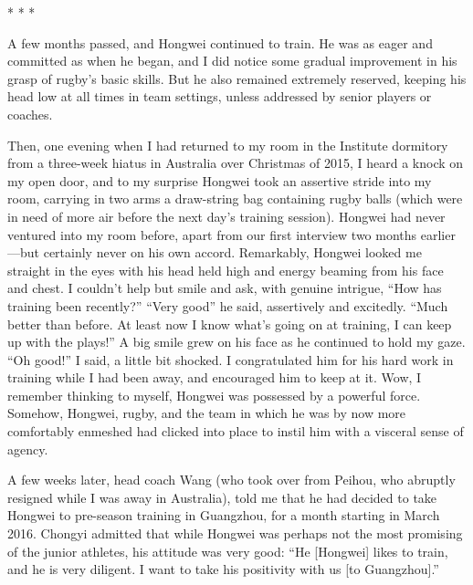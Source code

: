 \begin{CJK}{UTF8}{gbsn}
                            \begin{center}
                              * * *
                            \end{center}

A few months passed, and Hongwei continued to train.  He was as eager and committed as when he began, and I did notice some gradual improvement in his grasp of rugby's basic skills.  But he also remained extremely reserved, keeping his head low at all times in team settings, unless addressed by senior players or coaches.

Then, one evening when I had returned to my room in the Institute dormitory from a three-week hiatus in Australia over Christmas of 2015, I heard a knock on my open door, and to my surprise Hongwei took an assertive stride into my room, carrying in two arms a draw-string bag containing rugby balls (which were in need of more air before the next day's training session).  Hongwei had never ventured into my room before, apart from our first interview two months earlier---but certainly never on his own accord.  Remarkably, Hongwei looked me straight in the eyes with his head held high and energy beaming from his face and chest.  I couldn't help but smile and ask, with genuine intrigue, ``How has training been recently?''
``Very good'' he said, assertively and excitedly.  ``Much better than before.  At least now I know what’s going on at training, I can keep up with the plays!''  A big smile grew on his face as he continued to hold my gaze.  ``Oh good!'' I said, a little bit shocked.  I congratulated him for his hard work in training while I had been away, and encouraged him to keep at it.  Wow, I remember thinking to myself, Hongwei was possessed by a powerful force.  Somehow, Hongwei, rugby, and the team in which he was by now more comfortably enmeshed had clicked into place to instil him with a visceral sense of agency.

A few weeks later, head coach Wang (who took over from Peihou, who abruptly resigned while I was away in Australia), told me that he had decided to take Hongwei to pre-season training in Guangzhou, for a month starting in March 2016.  Chongyi admitted that while Hongwei was perhaps not the most promising of the junior athletes, his attitude was very good:  ``He [Hongwei] likes to train, and he is very diligent. I want to take his positivity with us [to Guangzhou].''


\end{CJK}
